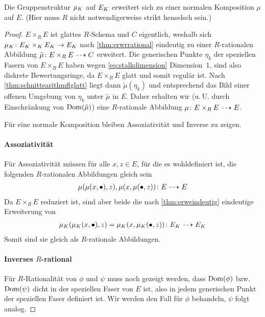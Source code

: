\documentclass[german, bibliography=totoc]{scrreprt}
\begin{document}
\begin{Lemma}
  Die Gruppenstruktur $\mu_{K}$ auf $E_{K}$ erweitert sich zu einer
  normalen Komposition $\mu$ auf $E$.
  (Hier muss $R$ nicht notwendigerweise strikt henselsch sein.)
  \begin{proof}
    $E\times_R E$ ist glattes $R$-Schema und $C$ eigentlich,
    weshalb sich $\mu_{K}\colon E_{K}\times_{K} E_{K}\to E_{K}$ nach
    \ref{thm:erwrrational} eindeutig zu einer $R$-rationalen
    Abbildung $\tilde\mu\colon E\times_R E\dashrightarrow C$ erweitert.
    Die generischen Punkte $\eta_k$ der speziellen Fasern von
    $E\times_R E$ haben wegen \ref{eq:stalkdimension}
    Dimension~1, sind also diskrete Bewertungsringe, da
    $E\times_R E$ glatt und somit regulär ist. Nach
    \ref{thm:schnittearithmflglatt} liegt dann
    $\tilde\mu(\eta_k)$ und entsprechend das Bild einer offenen
    Umgebung von $\eta_k$ unter $\tilde\mu$ in $E$. Daher erhalten
    wir (u.\,U. durch Einschränkung von $\operatorname{Dom}(\tilde\mu)$) eine
    $R$-rationale Abbildung $\mu\colon E\times_R E\dashrightarrow E$.

    Für eine normale Komposition bleiben Assoziativität und Inverse zu
    zeigen.

    \paragraph{Assoziativität}
    Für Assoziativität müssen für alle $x, z\in E$, für die es
    wohldefiniert ist, die folgenden $R$-rationalen 
    Abbildungen gleich sein
    \begin{gather*}
      \mu(\mu(x,\bullet),z), \mu(x,\mu(\bullet,z))
      \colon E \dashrightarrow E
    \end{gather*}
    Da $E\times_R E$ reduziert ist, sind aber beide die nach
    \ref{thm:erweindeutig} eindeutige Erweiterung von
    \begin{gather*}
      \mu_{K}(\mu_{K}(x,\bullet),z)=\mu_{K}(x,\mu_{K}(\bullet,z))
      \colon E_{K} \dashrightarrow E_{K}
    \end{gather*}
    Somit sind sie gleich als $R$-rationale Abbildungen.
    
    \paragraph{Inverses $R$-rational}
    Für $R$-Rationalität von $\phi$ und $\psi$ muss noch gezeigt
    werden, dass $\operatorname{Dom}(\phi)$ bzw. $\operatorname{Dom}(\psi)$ dicht in der
    speziellen Faser von $E$ ist, also in jedem generischen Punkt
    der speziellen Faser definiert ist.
    Wir werden den Fall für $\phi$ behandeln, $\psi$ folgt analog.
    

\end{proof}
\end{Lemma}
\end{document}
